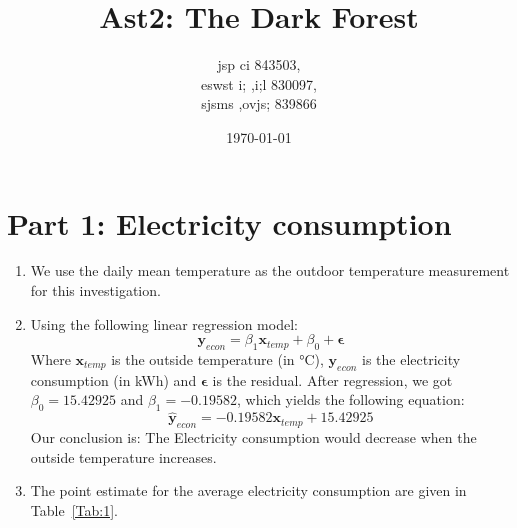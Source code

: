 \documentclass[12pt]{article}
\title{Ast2: The Dark Forest}
\author{jsp ci 843503,\\ 
	eswst i; ,i;l 830097,\\ 
sjsms ,ovjs; 839866}
\date{\today}
\begin{document}
	
\maketitle

\section{Part 1: Electricity consumption}

\begin{enumerate}
	\item We use the daily mean temperature as the outdoor temperature measurement for this investigation.
	\item Using the following linear regression model:
\[
\mathbf{y}_{econ} = \beta_1 \mathbf{x}_{temp} + \beta_0 + \mathbf{\epsilon}
\] 
Where $\mathbf{x}_{temp}$ is the outside temperature (in °C), $\mathbf{y}_{econ}$ is the electricity consumption (in kWh) and $\mathbf{\epsilon}$ is the residual. After regression, we got $\beta_0 = 15.42925$ and $\beta_1 = -0.19582$, which yields the following equation:
\[
\hat{\mathbf{y}}_{econ} = -0.19582 \mathbf{x}_{temp} + 15.42925
\] 
Our conclusion is: 
The Electricity consumption would decrease when the outside temperature increases.
\item The point estimate for the average electricity consumption are given in Table~\ref{Tab:1}.


\end{enumerate}
\end{document}
